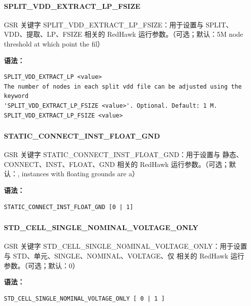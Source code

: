 \paragraph*{SPLIT_VDD_EXTRACT_LP_FSIZE}

GSR 关键字 SPLIT_VDD_EXTRACT_LP_FSIZE：用于设置与 SPLIT、VDD、提取、LP、FSIZE 相关的 RedHawk 运行参数。（可选；默认：5M node threshold at which point the fil）

\textbf{语法：}
\begin{lstlisting}
SPLIT_VDD_EXTRACT_LP <value>
The number of nodes in each split vdd file can be adjusted using the keyword
'SPLIT_VDD_EXTRACT_LP_FSIZE <value>'. Optional. Default: 1 M.
SPLIT_VDD_EXTRACT_LP_FSIZE <value>
\end{lstlisting}

\subsubsection{}
\paragraph*{STATIC_CONNECT_INST_FLOAT_GND}

GSR 关键字 STATIC_CONNECT_INST_FLOAT_GND：用于设置与 静态、CONNECT、INST、FLOAT、GND 相关的 RedHawk 运行参数。（可选；默认：, instances with floating grounds are a）

\textbf{语法：}
\begin{lstlisting}
STATIC_CONNECT_INST_FLOAT_GND [0 | 1]
\end{lstlisting}

\subsubsection{}
\paragraph*{STD_CELL_SINGLE_NOMINAL_VOLTAGE_ONLY}

GSR 关键字 STD_CELL_SINGLE_NOMINAL_VOLTAGE_ONLY：用于设置与 STD、单元、SINGLE、NOMINAL、VOLTAGE、仅 相关的 RedHawk 运行参数。（可选；默认：0）

\textbf{语法：}
\begin{lstlisting}
STD_CELL_SINGLE_NOMINAL_VOLTAGE_ONLY [ 0 | 1 ]
\end{lstlisting}

\subsubsection{}
